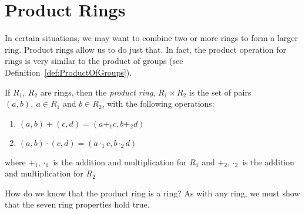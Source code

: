 \section{Product Rings}
\label{sec:ProductRings}

In certain situations, we may want to combine two or more rings to form a larger ring. Product rings allow us to do just that. In fact, the product operation for rings is very similar to the product of groups (see Definition~\ref{def:ProductOfGroups}).

\begin{defn}\label{product ring}
If $R_1,~R_2$ are rings, then the \emph{product ring}, $R_1\times R_2$ is the set of pairs $(a,b),~a\in R_1$ and $b\in R_2$, with the following operations:
\begin{enumerate}
\item $(a,b)+(c,d)=(a+_1c,b+_2d)$
\item $(a,b)\cdot(c,d)=(a\cdot_1c,b\cdot_2d)$
\end{enumerate}
where $+_1,\cdot_1$ is the addition and multiplication for $R_1$ and $+_2,\cdot_2$ is the addition and multiplication for $R_2$\\
\end{defn}
How do we know that the product ring is a ring? As with any ring, we must show that the seven ring properties hold true.

